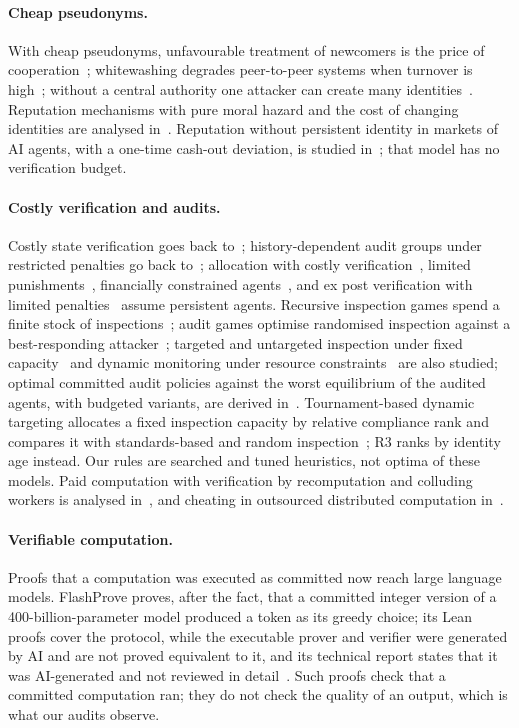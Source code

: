 \documentclass[11pt]{article}
\begin{document}
\paragraph{Cheap pseudonyms.} With cheap pseudonyms, unfavourable treatment of newcomers is the price of cooperation~\cite{friedman2001social}; whitewashing degrades peer-to-peer systems when turnover is high~\cite{feldman2006free}; without a central authority one attacker can create many identities~\cite{douceur2002sybil}. Reputation mechanisms with pure moral hazard and the cost of changing identities are analysed in~\cite{dellarocas2005reputation}. Reputation without persistent identity in markets of AI agents, with a one-time cash-out deviation, is studied in~\cite{gatta2026tempting}; that model has no verification budget.

\paragraph{Costly verification and audits.} Costly state verification goes back to~\cite{townsend1979optimal}; history-dependent audit groups under restricted penalties go back to~\cite{harrington1988enforcement}; allocation with costly verification~\cite{benporath2014optimal}, limited punishments~\cite{li2020mechanism}, financially constrained agents~\cite{li2021financially}, and ex post verification with limited penalties~\cite{mylovanov2017optimal} assume persistent agents. Recursive inspection games spend a finite stock of inspections~\cite{vonstengel2016recursive}; audit games optimise randomised inspection against a best-responding attacker~\cite{blocki2013audit}; targeted and untargeted inspection under fixed capacity~\cite{liu2013enforcement} and dynamic monitoring under resource constraints~\cite{solan2021dynamic} are also studied; optimal committed audit policies against the worst equilibrium of the audited agents, with budgeted variants, are derived in~\cite{das2026optimally}. Tournament-based dynamic targeting allocates a fixed inspection capacity by relative compliance rank and compares it with standards-based and random inspection~\cite{gilpatric2015competition}; R3 ranks by identity age instead. Our rules are searched and tuned heuristics, not optima of these models. Paid computation with verification by recomputation and colluding workers is analysed in~\cite{fernandezanta2015algorithmic}, and cheating in outsourced distributed computation in~\cite{golle2001uncheatable}.

\paragraph{Verifiable computation.} Proofs that a computation was executed as committed now reach large language models. FlashProve proves, after the fact, that a committed integer version of a 400-billion-parameter model produced a token as its greedy choice; its Lean proofs cover the protocol, while the executable prover and verifier were generated by AI and are not proved equivalent to it, and its technical report states that it was AI-generated and not reviewed in detail~\cite{rinberg2026flashprove}. Such proofs check that a committed computation ran; they do not check the quality of an output, which is what our audits observe.
\end{document}
